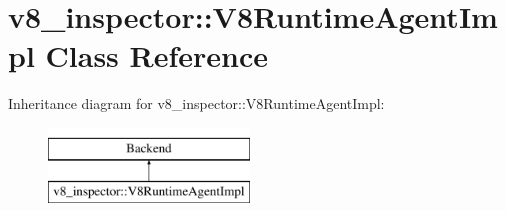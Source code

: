 \hypertarget{classv8__inspector_1_1V8RuntimeAgentImpl}{}\section{v8\+\_\+inspector\+:\+:V8\+Runtime\+Agent\+Impl Class Reference}
\label{classv8__inspector_1_1V8RuntimeAgentImpl}
Inheritance diagram for v8\+\_\+inspector\+:\+:V8\+Runtime\+Agent\+Impl\+:\begin{figure}[H]
\begin{center}
\leavevmode
\includegraphics[height=2.000000cm]{classv8__inspector_1_1V8RuntimeAgentImpl}
\end{center}
\end{figure}
